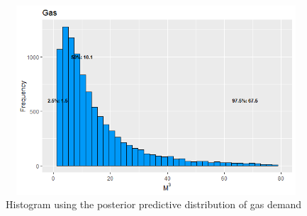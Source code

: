 \begin{enumerate}[leftmargin=*]
\begin{figure}[!h]
	\includegraphics[width=340pt, height=200pt]{Chapters/chapter4/figures/GasMulti.png}
	\caption[List of figure caption goes here]{Histogram using the posterior predictive distribution of gas demand}\label{fig15}
\end{figure}    
\end{enumerate}



